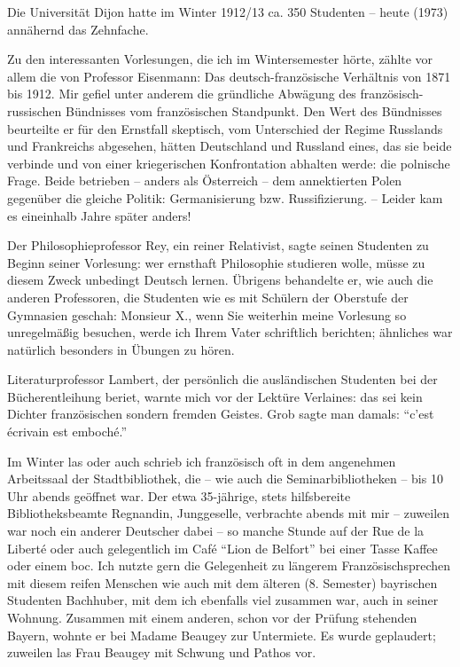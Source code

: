 \documentclass[a5paper,pagesize,10pt,twoside=true]{scrbook}
\renewcommand{\marginpar}[2][]{}
\begin{document}
Die Universität Dijon hatte im Winter 1912/13 ca. 350 Studenten -- heute (1973) annähernd das Zehnfache.

Zu den interessanten Vorlesungen, die ich im Wintersemester hörte, zählte vor allem die von Professor Eisenmann: Das deutsch-französische Verhältnis von 1871 bis 1912. Mir gefiel unter anderem die gründliche Abwägung des französisch-russischen Bündnisses vom französischen Standpunkt. Den Wert des Bündnisses beurteilte er für den Ernstfall skeptisch, vom Unterschied der Regime Russlands und Frankreichs abgesehen, hätten Deutschland und Russland eines, das sie beide verbinde und von einer kriegerischen Konfrontation abhalten werde: die polnische Frage. Beide betrieben -- anders als Österreich -- dem annektierten Polen gegenüber die gleiche Politik: Germanisierung bzw. Russifizierung. -- Leider kam es eineinhalb Jahre später anders!

\marginpar{117}
Der Philosophieprofessor Rey, ein reiner Relativist, sagte seinen Studenten zu Beginn seiner Vorlesung: wer ernsthaft Philosophie studieren wolle, müsse zu diesem Zweck unbedingt Deutsch lernen. Übrigens behandelte er, wie auch die anderen Professoren, die Studenten wie es mit Schülern der Oberstufe der Gymnasien geschah: Monsieur X., wenn Sie weiterhin meine Vorlesung so unregelmäßig besuchen, werde ich Ihrem Vater schriftlich berichten; ähnliches war natürlich besonders in Übungen zu hören.

Literaturprofessor Lambert, der persönlich die ausländischen Studenten bei der Bücherentleihung beriet, warnte mich vor der Lektüre Verlaines: das sei kein Dichter französischen sondern fremden Geistes. Grob sagte man damals: \enquote{c'est écrivain est emboché.}

Im Winter las oder auch schrieb ich französisch oft in dem angenehmen Arbeitssaal der Stadtbibliothek, die -- wie auch die Seminarbibliotheken -- bis 10 Uhr abends geöffnet war. Der etwa 35-jährige, stets hilfsbereite Bibliotheksbeamte Regnandin, Junggeselle, verbrachte abends mit mir -- zuweilen war noch ein anderer Deutscher dabei -- so manche Stunde auf der Rue de la Liberté oder auch gelegentlich im Café \enquote{Lion de Belfort} bei einer Tasse Kaffee oder einem boc. Ich nutzte gern die Gelegenheit zu längerem Französischsprechen mit diesem reifen Menschen wie auch mit dem älteren (8. Semester) bayrischen Studenten Bachhuber, mit dem ich ebenfalls viel zusammen war, auch in seiner Wohnung. Zusammen mit einem anderen, schon vor der Prüfung stehenden Bayern, wohnte er bei Madame Beaugey zur Untermiete. Es wurde geplaudert; zuweilen las Frau Beaugey mit Schwung und Pathos vor.
\end{document}
